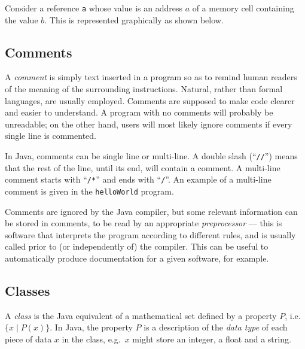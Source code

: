 \documentclass[a4paper]{book}
\theoremstyle{changebreak}                %
\begin{document}
Consider a reference {\tt a} whose value is an address $a$ of a memory
cell containing the value $b$. This is represented graphically as
shown below.
\begin{center}
\end{center}

\subsection{Comments}
\label{s:java:comments}
A {\it comment} is simply text inserted in a program so
as to remind human readers of the meaning of the surrounding
instructions. Natural, rather than formal
languages, are usually employed. Comments are
supposed to make code clearer and easier to understand. A program with
no comments will probably be unreadable; on the other hand, users will
most likely ignore comments if every single line is commented.

In Java, comments can be single line or multi-line. A double slash
(``{\tt //}'') means that the rest of the line, until its end, will
contain a comment. A multi-line comment starts with ``{\tt /*}'' and
ends with ``{\tt */}''. An example of a multi-line comment is given in
the {\tt helloWorld} program.

Comments are ignored by the Java compiler, but some
relevant information can be stored in comments, to be read by an
appropriate {\it preprocessor} --- this is
software that interprets the program according to different rules, and
is usually called prior to (or independently of) the compiler. This
can be useful to automatically produce documentation for a given
software, for example.

\subsection{Classes}
A {\it class} is the Java equivalent of a
mathematical set defined by a property
$P$, i.e.~$\{x\;|\;P(x)\}$. In Java, the property
$P$ is a description of the {\it data type} of each
piece of data $x$ in the class, e.g.~$x$ might store an integer, a
float and a string.
\end{document}
